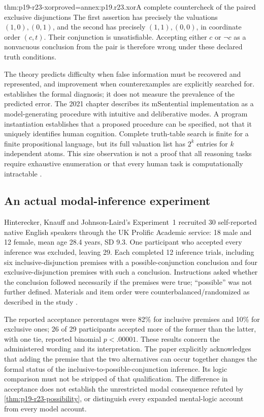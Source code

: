 \begin{hbtheorem}{thm:p19-r23-xor}{proved=annex:p19.r23.xor}{A complete countercheck of the paired exclusive disjunctions}
The first assertion has precisely the valuations \((1,0),(0,1)\), and
the second has precisely \((1,1),(0,0)\), in coordinate order \((c,t)\).
Their conjunction is unsatisfiable. Accepting either \(c\) or
\(\neg c\) as a nonvacuous conclusion from the pair is therefore wrong
under these declared truth conditions.
\end{hbtheorem}

The theory predicts difficulty when false information must be recovered
and represented, and improvement when counterexamples are explicitly
searched for.  establishes the formal diagnosis; it
does not measure the prevalence of the predicted error. The 2021 chapter
describes its mSentential implementation as a model-generating procedure
with intuitive and deliberative modes. A program instantiation establishes
that a proposed procedure can be specified, not that it uniquely identifies
human cognition. Complete truth-table search is finite for a finite
propositional language, but its full valuation list has \(2^k\) entries
for \(k\) independent atoms. This size observation is not a proof that
all reasoning tasks require exhaustive enumeration or that every human
task is computationally intractable
\cite[pp.~148--150]{JohnsonLaird2021MentalModels}.

\subsection{An actual modal-inference experiment}

Hinterecker, Knauff and Johnson-Laird's Experiment~1 recruited 30
self-reported native English speakers through the UK Prolific Academic
service: 18 male and 12 female, mean age
28.4 years, SD 9.3. One participant who accepted every inference was
excluded, leaving 29. Each completed 12 inference trials, including six
inclusive-disjunction premises with a possible-conjunction conclusion and
four exclusive-disjunction premises with such a conclusion. Instructions
asked whether the conclusion followed necessarily if the premises were
true; ``possible'' was not further defined. Materials and item order were
counterbalanced/randomized as described in the study
\cite[early-online pp.~5--7]{HintereckerKnauffJohnsonLaird2016Modality}.

The reported acceptance percentages were 82\% for inclusive premises
and 10\% for exclusive ones; 26 of 29 participants accepted more of the
former than the latter, with one tie, reported binomial \(p<.00001\).
These results concern the administered wording and its interpretation.
The paper explicitly acknowledges that adding the premise that the two
alternatives can occur together changes the formal status of the
inclusive-to-possible-conjunction inference. Its logic comparison must not
be stripped of that qualification. The difference in acceptance does not
establish the unrestricted modal consequence refuted by
\cref{thm:p19-r23-possibility}, or distinguish every expanded mental-logic
account from every model account.

